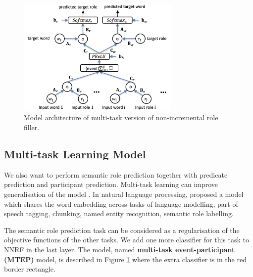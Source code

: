 \documentclass[a4paper]{article}
\begin{document}
\begin{figure}[t]
\centering
\includegraphics[width=0.7\textwidth]{MTRF.png}
\caption{\label{fig:MTEP} Model architecture of multi-task version of non-incremental role filler.}
\end{figure}


\subsection{Multi-task Learning Model} \label{sec:mtl}
We also want to perform semantic role prediction together with predicate prediction and participant prediction. Multi-task learning can improve generalisation of the model \citep{caruana1998multitask}. In natural language processing, \citet{collobert2011natural} proposed a model which shares the word embedding across tasks of language modelling, part-of-speech tagging, chunking, named entity recognition, semantic role labelling. 

The semantic role prediction task can be considered as a regularisation of the objective functions of the other tasks. We add one more classifier for this task to NNRF in the last layer. The model, named \textbf{multi-task event-participant (MTEP)} model, is described in Figure \ref{fig:MTEP} where the extra classifier is in the red border rectangle. 
\end{document}
